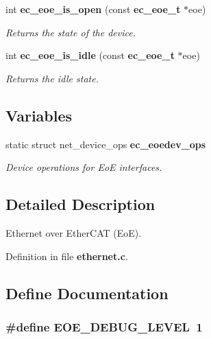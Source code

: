 \begin{DoxyCompactItemize}
int {\bf ec\-\_\-eoe\-\_\-is\-\_\-open} (const {\bf ec\-\_\-eoe\-\_\-t} $\ast$eoe)
\begin{DoxyCompactList}\small\item\em \-Returns the state of the device. \end{DoxyCompactList}\item 
int {\bf ec\-\_\-eoe\-\_\-is\-\_\-idle} (const {\bf ec\-\_\-eoe\-\_\-t} $\ast$eoe)
\begin{DoxyCompactList}\small\item\em \-Returns the idle state. \end{DoxyCompactList}\end{DoxyCompactItemize}
\subsection*{\-Variables}
\begin{DoxyCompactItemize}
\item 
static struct net\-\_\-device\-\_\-ops {\bf ec\-\_\-eoedev\-\_\-ops}
\begin{DoxyCompactList}\small\item\em \-Device operations for \-Eo\-E interfaces. \end{DoxyCompactList}\end{DoxyCompactItemize}


\subsection{\-Detailed \-Description}
\-Ethernet over \-Ether\-C\-A\-T (\-Eo\-E). 

\-Definition in file {\bf ethernet.\-c}.



\subsection{\-Define \-Documentation}
\subsubsection[{\-E\-O\-E\-\_\-\-D\-E\-B\-U\-G\-\_\-\-L\-E\-V\-E\-L}]{\setlength{\rightskip}{0pt plus 5cm}\#define {\bf \-E\-O\-E\-\_\-\-D\-E\-B\-U\-G\-\_\-\-L\-E\-V\-E\-L}~1}\label{ethernet_8c_a6e67793856d7614e89ecdf6bd55c59de}


